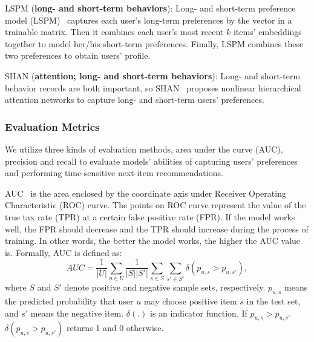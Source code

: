 \documentclass[preprint,12pt]{elsarticle}
\begin{document}
\begin{sloppypar}
LSPM (\textbf{long- and short-term behaviors}): Long- and short-term preference model (LSPM)~\cite{lspm} captures each user's long-term preferences by the vector in a trainable matrix. Then it combines each user's most recent $k$ items' embeddings together to model her/his short-term preferences. Finally, LSPM combines these two preferences to obtain users' profile.

SHAN (\textbf{attention; long- and short-term behaviors}): Long- and short-term behavior records are both important, so SHAN~\cite{ying2018sequential} proposes nonlinear hierarchical attention networks to capture long- and short-term users' preferences.

\subsubsection{Evaluation Metrics}
\label{sec_eval}

We utilize three kinds of evaluation methods, area under the curve (AUC), precision and recall to evaluate models' abilities of capturing users' preferences and performing time-sensitive next-item recommendations.

AUC~\cite{zhou2018atrank} is the area enclosed by the coordinate axis under Receiver Operating Characteristic (ROC) curve. The points on ROC curve represent the value of the true tax rate (TPR) at a certain false positive rate (FPR). If the model works well, the FPR should decrease and the TPR should increase during the process of training. In other words, the better the model works, the higher the AUC value is. Formally, AUC is defined as:
\begin{equation}
AUC = \frac{1}{|U|} \sum_{u\in U} \frac{1}{|S||S'|} \sum_{s\in S} \sum_{s'\in S'} \delta(p_{u,s} > p_{u,s'}),
\end{equation}
where $S$ and $S'$ denote positive and negative sample sets, respectively. $p_{u,s}$ means the predicted probability that user $u$ may choose positive item $s$ in the test set, and $s'$ means the negative item. $\delta(.)$ is an indicator function. If $p_{u,s} > p_{u,s'}$ $\delta(p_{u,s} > p_{u,s'})$ returns 1 and 0 otherwise.


\end{sloppypar}
\end{document}
